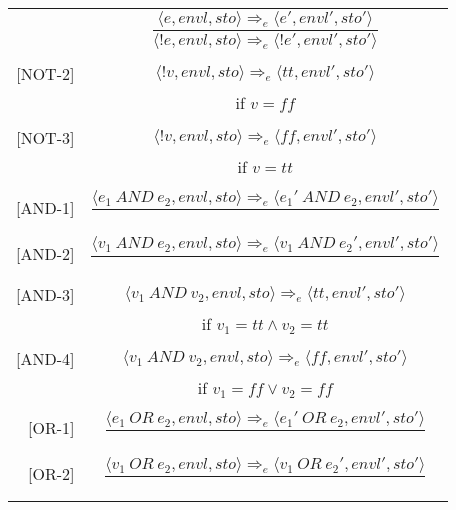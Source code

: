 \begin{longtable}[c] { r c }
  \centering
  [NOT-1] & \( 
    \dfrac { \langle e, envl, sto \rangle \Rightarrow_e \langle e', envl', sto' \rangle }
      { \langle !e, envl, sto \rangle \Rightarrow_e \langle !e', envl', sto' \rangle } \)
  \\
  & \\

  [NOT-2] & \( 
    \langle !v, envl, sto \rangle \Rightarrow_e \langle tt, envl', sto' \rangle \)
  \\
  & if \( v = ff\) \\
  & \\

  [NOT-3] & \( 
    \langle !v, envl, sto \rangle \Rightarrow_e \langle ff, envl', sto' \rangle \)
  \\
  & if \( v = tt \) \\
  & \\

  [AND-1] & \( 
    \dfrac { \langle e_1 \ AND \ e_2, envl, sto \rangle \Rightarrow_e \langle e_1' \ AND \ e_2, envl', sto' \rangle }
      { } \)
  \\
  & \\

  [AND-2] & \( 
    \dfrac { \langle v_1 \ AND \ e_2, envl, sto \rangle \Rightarrow_e \langle v_1 \ AND \ e_2', envl', sto' \rangle }
      { } \)
  \\
  & \\

  [AND-3] & \( 
    \langle v_1 \ AND \ v_2, envl, sto \rangle \Rightarrow_e \langle tt, envl', sto' \rangle \)
  \\
  & if \( v_1 = tt \land v_2 = tt\) \\
  & \\

  [AND-4] & \( 
    \langle v_1 \ AND \ v_2, envl, sto \rangle \Rightarrow_e \langle ff, envl', sto' \rangle \)
  \\
  & if \( v_1 = ff \lor  v_2 = ff \) \\
  & \\

  [OR-1] & \( 
    \dfrac { \langle e_1 \ OR \ e_2, envl, sto \rangle \Rightarrow_e \langle e_1' \ OR \ e_2, envl', sto' \rangle }
      { } \)
  \\
  & \\

  [OR-2] & \( 
    \dfrac { \langle v_1 \ OR \ e_2, envl, sto \rangle \Rightarrow_e \langle v_1 \ OR \ e_2', envl', sto' \rangle }
      { } \)
  \\
  & \\


\end{longtable}
